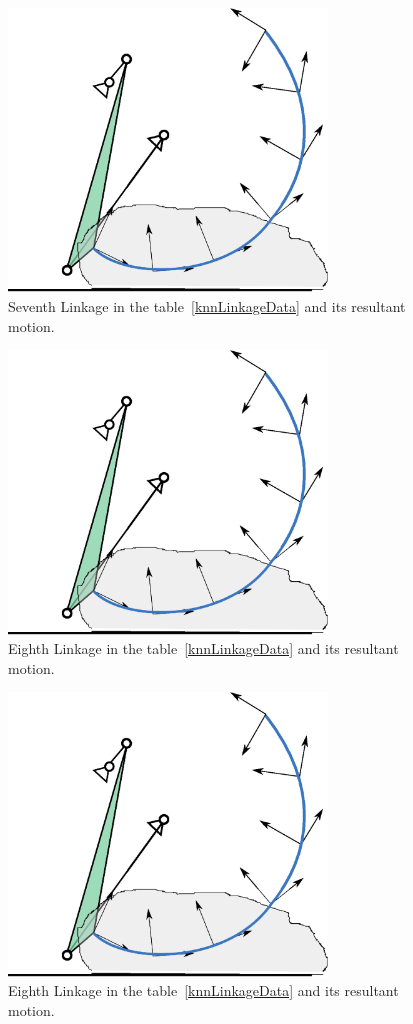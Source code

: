 \documentclass[twocolumn,10pt]{asme2e}
\begin{document}
\begin{figure}
\centering
\includegraphics[width=240pt]{figure/sol7.eps}
  \caption{Seventh Linkage in the table~\ref{knnLinkageData} and its resultant motion.}
\label{knnSol7}
\end{figure}

\begin{figure}
\centering
\includegraphics[width=240pt]{figure/sol7.eps}
  \caption{Eighth Linkage in the table~\ref{knnLinkageData} and its resultant motion.}
\label{knnSol8}
\end{figure}

\begin{figure}
\centering
\includegraphics[width=240pt]{figure/sol7.eps}
  \caption{Eighth Linkage in the table~\ref{knnLinkageData} and its resultant motion.}
\label{knnSol9}
\end{figure}
\end{document}
